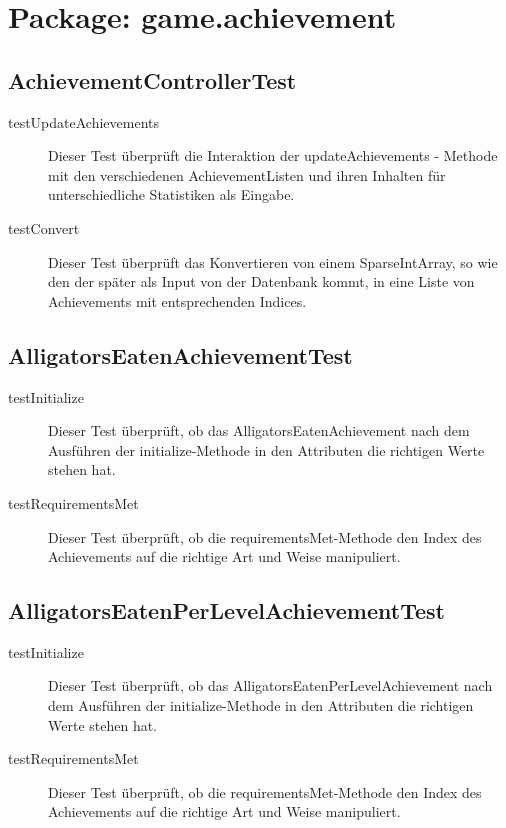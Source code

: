\section{Package: game.achievement}

\subsection{AchievementControllerTest}

\begin{description}

\item[testUpdateAchievements]
Dieser Test überprüft die Interaktion der updateAchievements - Methode mit den verschiedenen AchievementListen und ihren Inhalten für unterschiedliche Statistiken als Eingabe. 

\item[testConvert]
Dieser Test überprüft das Konvertieren von einem SparseIntArray, so wie den der später als Input von der Datenbank kommt, in eine Liste von Achievements mit entsprechenden Indices.

\end{description}

\subsection{AlligatorsEatenAchievementTest}

\begin{description}
\item[testInitialize]
Dieser Test überprüft, ob das AlligatorsEatenAchievement nach dem Ausführen der initialize-Methode in den Attributen die richtigen Werte stehen hat.

\item[testRequirementsMet]
Dieser Test überprüft, ob die requirementsMet-Methode den Index des Achievements auf die richtige Art und Weise manipuliert.

\end{description}

\subsection{AlligatorsEatenPerLevelAchievementTest}

\begin{description}
\item[testInitialize]
Dieser Test überprüft, ob das AlligatorsEatenPerLevelAchievement nach dem Ausführen der initialize-Methode in den Attributen die richtigen Werte stehen hat.

\item[testRequirementsMet]
Dieser Test überprüft, ob die requirementsMet-Methode den Index des Achievements auf die richtige Art und Weise manipuliert.

\end{description}

